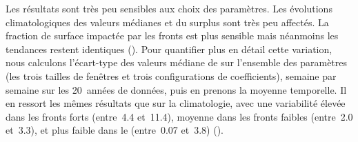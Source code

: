 \begin{table}
  \centering
  \caption[]{%
    Coefficients de normalisation pour les différents paramètres utilisés.
  }
  \label{tab:coefs}
\end{table}

Les résultats sont très peu sensibles aux choix des paramètres.
Les évolutions climatologiques des valeurs médianes et du surplus sont très peu affectés. La fraction de surface impactée par les fronts est plus sensible mais néanmoins les tendances restent identiques ().
Pour quantifier plus en détail cette variation, nous calculons l'écart-type des valeurs médiane de  sur l'ensemble des paramètres (les trois tailles de fenêtres et trois configurations de coefficients), semaine par semaine sur les 20~années de données, puis en prenons la moyenne temporelle.
Il en ressort les mêmes résultats que sur la climatologie, avec une variabilité élevée dans les fronts forts (entre~\qty{4.4}{\mugm} et~\qty{11.4}{\mugm}), moyenne dans les fronts faibles (entre~\qty{2.0}{\mugm} et~\qty{3.3}{\mugm}), et plus faible dans le  (entre~\qty{0.07}{\mugm} et~\qty{3.8}{\mugm}) ().

